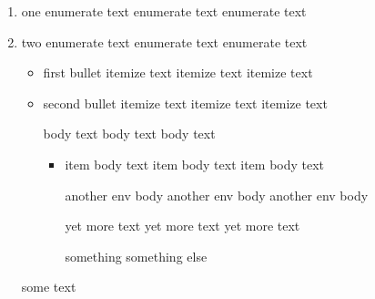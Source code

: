 \begin{enumerate}                                       %
	\item one                                           %
	      enumerate text
	      enumerate text
	      enumerate text
	\item two                                           %
	      enumerate text
	      enumerate text
	      enumerate text
	      \begin{itemize}                               %
		      \item first bullet                        %
		            itemize text
		            itemize text
		            itemize text
		      \item second bullet                       %
		            itemize text
		            itemize text
		            itemize text
		            \begin{myenv}                       %
			            body text
			            body text
			            body text
			            \begin{itemize}                 %
				            \item item body text        %
				                  item body text
				                  item body text
				                  \begin{anotherenv}    %
					                  another env body
					                  another env body
					                  another env body
					                  \if
						                  \begin{another}
							                  yet more text
							                  yet more text
							                  yet more text
						                  \end{another}
						                  something
					                  \else
						                  something else
					                  \fi
				                  \end{anotherenv}
			            \end{itemize}
		            \end{myenv}
	      \end{itemize}
	      some text
\end{enumerate}
